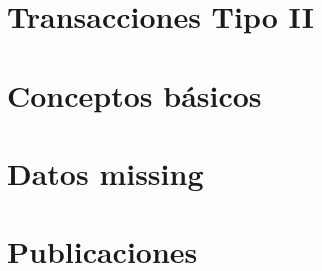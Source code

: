 \label{sec:clasificacion:conceptos-basicos}





\section{Transacciones Tipo II}
\label{sec:catalogos:transacciones-tipo-ii}





\section{Conceptos básicos}
\label{sec:clasificacion:conceptos-basicos}





\section{\Catalogo}
\label{sec:clasificacion:catalogo}





\section{\CC}
\label{sec:clasificacion:catalogo-completo}





\section{Datos missing}
\label{sec:clasificacion:datos-missing}





\section{Publicaciones}
\label{sec:clasificacion:publicaciones}

